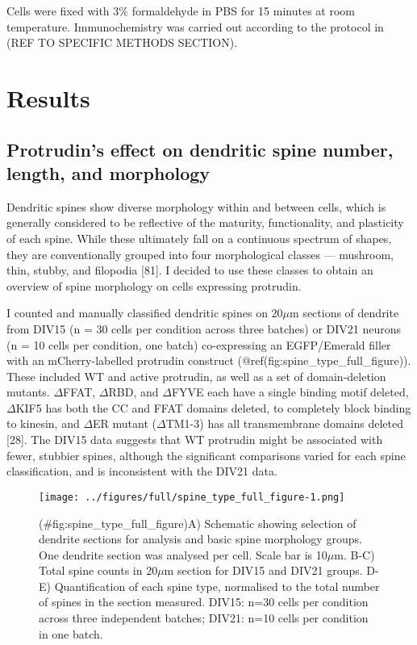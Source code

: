 \documentclass[
  12pt,
  a4paper,
]{book}
\begin{document}
Cells were fixed with 3\% formaldehyde in PBS for 15 minutes at room temperature. Immunochemistry was carried out according to the protocol in (REF TO SPECIFIC METHODS SECTION).

\hypertarget{results-1}{%
\section{Results}\label{results-1}}

\hypertarget{protrudins-effect-on-dendritic-spine-number-length-and-morphology}{%
\subsection{Protrudin's effect on dendritic spine number, length, and morphology}\label{protrudins-effect-on-dendritic-spine-number-length-and-morphology}}

Dendritic spines show diverse morphology within and between cells, which is generally considered to be reflective of the maturity, functionality, and plasticity of each spine. While these ultimately fall on a continuous spectrum of shapes, they are conventionally grouped into four morphological classes --- mushroom, thin, stubby, and filopodia {[}81{]}. I decided to use these classes to obtain an overview of spine morphology on cells expressing protrudin.

I counted and manually classified dendritic spines on 20\(\mu\)m sections of dendrite from DIV15 (n = 30 cells per condition across three batches) or DIV21 neurons (n = 10 cells per condition, one batch) co-expressing an EGFP/Emerald filler with an mCherry-labelled protrudin construct (@ref(fig:spine\_type\_full\_figure)). These included WT and active protrudin, as well as a set of domain-deletion mutants. \(\Delta\)FFAT, \(\Delta\)RBD, and \(\Delta\)FYVE each have a single binding motif deleted, \(\Delta\)KIF5 has both the CC and FFAT domains deleted, to completely block binding to kinesin, and \(\Delta\)ER mutant (\(\Delta\)TM1-3) has all transmembrane domains deleted {[}28{]}. The DIV15 data suggests that WT protrudin might be associated with fewer, stubbier spines, although the significant comparisons varied for each spine classification, and is inconsistent with the DIV21 data.

\begin{figure}
\centering
\texttt{[image: ../figures/full/spine\_type\_full\_figure-1.png]}
\caption{(\#fig:spine\_type\_full\_figure)A) Schematic showing selection of dendrite sections for analysis and basic spine morphology groups. One dendrite section was analysed per cell. Scale bar is 10\(\mu\)m. B-C) Total spine counts in 20\(\mu\)m section for DIV15 and DIV21 groups. D-E) Quantification of each spine type, normalised to the total number of spines in the section measured. DIV15: n=30 cells per condition across three independent batches; DIV21: n=10 cells per condition in one batch.}
\end{figure}
\end{document}
